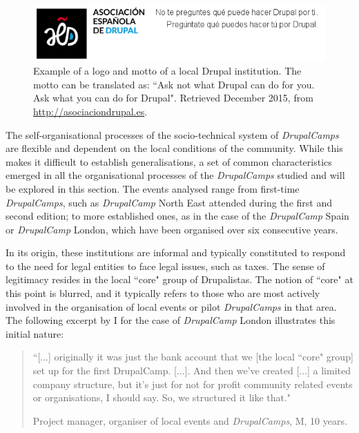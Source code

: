 \begin{figure}[H]
\centering
\includegraphics[scale=0.75]{img/offline/aed_logo}
\caption[Spanish Drupal Association logo and motto]%
{Example of a logo and motto of a local Drupal institution. The motto can be translated as: ``Ask not what Drupal can do for you. Ask what you can do for Drupal". Retrieved  December 2015, from \url{http://asociaciondrupal.es}.}
\label{aed-logo}
\end{figure}

The self-organisational processes of the socio-technical system of \textit{DrupalCamps} are flexible and dependent on the local conditions of the community.  While this makes it difficult to establish generalisations, a set of common characteristics emerged in all the organisational processes of the \textit{DrupalCamps} studied and will be explored in this section. The events analysed range from first-time \textit{DrupalCamps}, such as \textit{DrupalCamp} North East attended during the first and second edition; to more established ones, as in the case of the \textit{DrupalCamp} Spain or \textit{DrupalCamp} London, which have been organised over six consecutive years.

In its origin, these institutions are informal and typically constituted to respond to the need for legal entities to face legal issues, such as taxes. The sense of legitimacy resides in the local ``core" group of Drupalistas. The notion of ``core" at this point is blurred, and it typically refers to those who are most actively involved in the organisation of local events or pilot \textit{DrupalCamps} in that area. The following excerpt by I for the case of \textit{DrupalCamp} London illustrates this initial nature:

\begin{quotation}
``[...] originally it was just the bank account that we [the local ``core" group] set up for the first DrupalCamp. [...]. And then we've created [...] a limited company structure, but it's just for not for profit community related events or organisations, I should say. So, we structured it like that."

\begin{flushright}\footnotesize{Project manager, organiser of local events and \textit{DrupalCamps}, M, 10 years.}\end{flushright}
\end{quotation}


